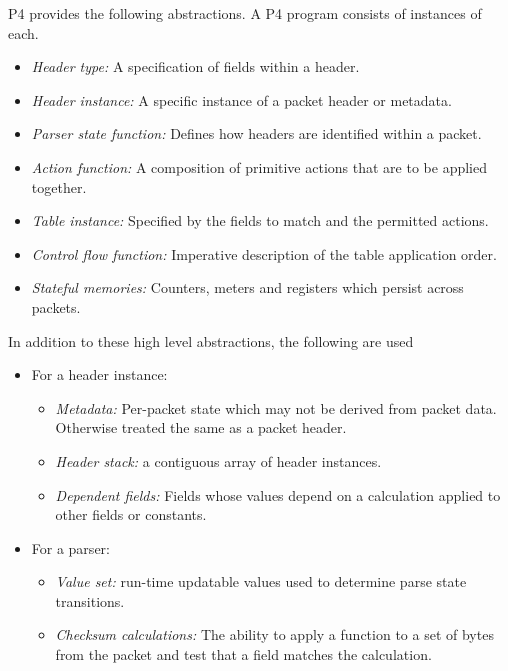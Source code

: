 \documentclass[12pt]{article}
\begin{document}
P4 provides the following abstractions. A P4 program consists of instances
of each.

\begin{itemize}
\item
\textit{Header type:} A specification of fields within a header.
\item
\textit{Header instance:} A specific instance of a packet header or metadata.
\item
\textit{Parser state function:} Defines how headers are identified
within a packet.
\item
\textit{Action function:} A composition of primitive actions that are to be applied
together.
\item
\textit{Table instance:} Specified by the fields to match and the permitted actions.
\item
\textit{Control flow function:} Imperative description of the table application order.
\item
\textit{Stateful memories:} Counters, meters and registers which persist across packets.
\end{itemize}


In addition to these high level abstractions, the following are used

\begin{itemize}
\item
For a header instance:
\begin{itemize}
\item
\textit{Metadata:} Per-packet state which may not be derived from
packet data. Otherwise treated the same as a packet header.
\item
\textit{Header stack:} a contiguous array of header instances.
\item
\textit{Dependent fields:} Fields whose values depend on a calculation
applied to other fields or constants.
\end{itemize}

\item
For a parser:

\begin{itemize}
\item
\textit{Value set:} run-time updatable values used to determine parse
state transitions.
\item
\textit{Checksum calculations:} The ability to apply a function to a
set of bytes from the packet and test that a field matches the
calculation.
\end{itemize}

\end{itemize}
\end{document}
